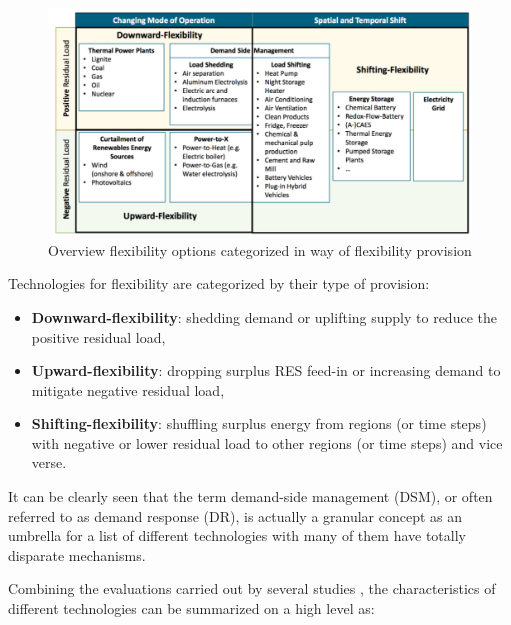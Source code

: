 \begin{figure}[h!]
	\centering
	\includegraphics[width=0.95\linewidth]{Figures/TechnologyOptions}
	\caption{Overview flexibility options categorized in way of flexibility provision \cite{Muller2016}}
	\label{fig:TechnologyOptions}
\end{figure}

Technologies for flexibility are categorized by their type of provision:

\begin{itemize}
	\item \textbf{Downward-flexibility}: shedding demand or uplifting supply to reduce the positive residual load,
	\item \textbf{Upward-flexibility}: dropping surplus RES feed-in or increasing demand to mitigate negative residual load,
	\item  \textbf{Shifting-flexibility}: shuffling surplus energy from regions (or time steps) with negative or lower residual load to other regions (or time steps) and vice verse.
\end{itemize}

It can be clearly seen that the term demand-side management (DSM), or often referred to as demand response (DR), is actually a granular concept as an umbrella for a list of different technologies with many of them have totally disparate mechanisms. 

Combining the evaluations carried out by several studies \cite{Cochran2014,Wang2017,Lund2015,Muller2016,Despres2017}, the characteristics of different technologies can be summarized on a high level as:

